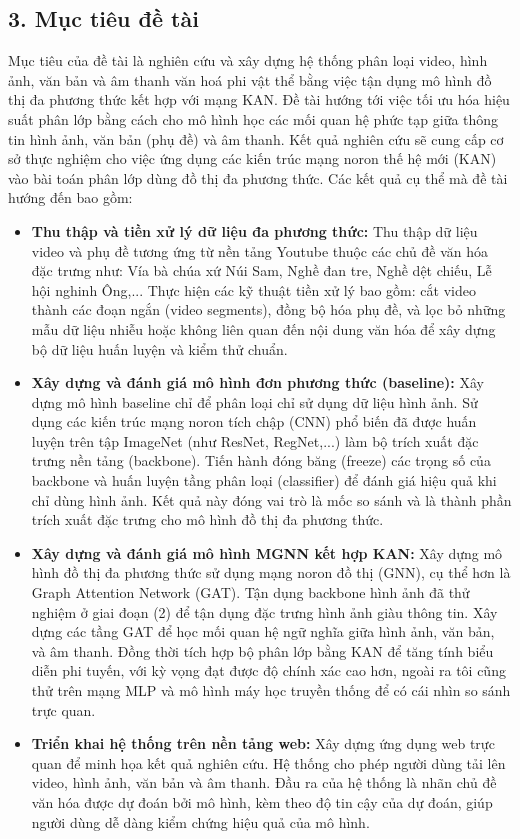 \subsection{3. Mục tiêu đề tài}
\indent\indent Mục tiêu của đề tài là nghiên cứu và xây dựng hệ thống phân loại video, hình ảnh, văn bản và âm thanh văn hoá phi vật thể bằng việc tận dụng mô hình đồ thị đa phương thức kết hợp với mạng KAN. Đề tài hướng tới việc tối ưu hóa hiệu suất phân lớp bằng cách cho mô hình học các mối quan hệ phức tạp giữa thông tin hình ảnh, văn bản (phụ đề) và âm thanh. Kết quả nghiên cứu sẽ cung cấp cơ sở thực nghiệm cho việc ứng dụng các kiến trúc mạng noron thế hệ mới (KAN) vào bài toán phân lớp dùng đồ thị đa phương thức. Các kết quả cụ thể mà đề tài hướng đến bao gồm:

\begin{itemize}[label={--}, itemsep=1pt]
    \item \textbf{Thu thập và tiền xử lý dữ liệu đa phương thức:} Thu thập dữ liệu video và phụ đề tương ứng từ nền tảng Youtube thuộc các chủ đề văn hóa đặc trưng như: Vía bà chúa xứ Núi Sam, Nghề đan tre, Nghề dệt chiếu, Lễ hội nghinh Ông,... Thực hiện các kỹ thuật tiền xử lý bao gồm: cắt video thành các đoạn ngắn (video segments), đồng bộ hóa phụ đề, và lọc bỏ những mẫu dữ liệu nhiễu hoặc không liên quan đến nội dung văn hóa để xây dựng bộ 
    dữ liệu huấn luyện và kiểm thử chuẩn.
    \item \textbf{Xây dựng và đánh giá mô hình đơn phương thức (baseline):} Xây dựng mô hình baseline chỉ để phân loại chỉ sử dụng dữ liệu hình ảnh. Sử dụng các kiến trúc mạng noron tích chập (CNN) phổ biến đã được huấn luyện trên tập ImageNet (như ResNet, RegNet,...) làm bộ trích xuất đặc trưng nền tảng (backbone). Tiến hành đóng băng (freeze) các trọng số của backbone và huấn luyện tầng phân loại (classifier) để đánh giá hiệu quả khi chỉ dùng hình ảnh. Kết quả này đóng vai trò là mốc so sánh và là thành phần trích xuất đặc trưng cho mô hình đồ thị đa phương thức.
    \item \textbf{Xây dựng và đánh giá mô hình MGNN kết hợp KAN:} Xây dựng mô hình đồ thị đa phương thức sử dụng mạng noron đồ thị (GNN), cụ thể hơn là Graph Attention Network (GAT). Tận dụng backbone hình ảnh đã thử nghiệm ở giai đoạn (2) để tận dụng đặc trưng hình ảnh giàu thông tin. Xây dựng các tầng GAT để học mối quan hệ ngữ nghĩa giữa hình ảnh, văn bản, và âm thanh. Đồng thời tích hợp bộ phân lớp bằng KAN để tăng tính biểu diễn phi tuyến, với kỳ vọng đạt được độ chính xác cao hơn, ngoài ra tôi cũng thử trên mạng MLP và mô hình máy học truyền thống để có cái nhìn so sánh trực quan.
    \item \textbf{Triển khai hệ thống trên nền tảng web:} Xây dựng ứng dụng web trực quan để minh họa kết quả nghiên cứu. Hệ thống cho phép người dùng tải lên video, hình ảnh, văn bản và âm thanh. Đầu ra của hệ thống là nhãn chủ đề văn hóa được dự đoán bởi mô hình, kèm theo độ tin cậy của dự đoán, giúp người dùng dễ dàng kiểm chứng hiệu quả của mô hình.
\end{itemize}